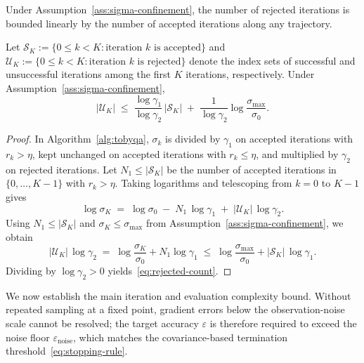 Under Assumption~\ref{ass:sigma-confinement}, the number of rejected iterations is bounded linearly by the number of accepted iterations along any trajectory.

\begin{proposition}
\label{prop:rejected-bound}
Let $\mathcal{S}_K := \{0 \le k < K : \text{iteration } k \text{ is accepted}\}$ and $\mathcal{U}_K := \{0 \le k < K : \text{iteration } k \text{ is rejected}\}$ denote the index sets of successful and unsuccessful iterations among the first $K$ iterations, respectively. Under Assumption~\ref{ass:sigma-confinement},
\begin{equation}\label{eq:rejected-count}
  |\mathcal{U}_K| \;\le\; \frac{\log \gamma_1}{\log \gamma_2}\,|\mathcal{S}_K| \;+\; \frac{1}{\log \gamma_2}\log\frac{\sigma_{\max}}{\sigma_0}.
\end{equation}
\end{proposition}

\begin{proof}
In Algorithm~\ref{alg:tobyqa}, $\sigma_k$ is divided by $\gamma_1$ on accepted iterations with $r_k > \eta$, kept unchanged on accepted iterations with $r_k \le \eta$, and multiplied by $\gamma_2$ on rejected iterations. Let $N_1 \le |\mathcal{S}_K|$ be the number of accepted iterations in $\{0, \dots, K-1\}$ with $r_k > \eta$. Taking logarithms and telescoping from $k = 0$ to $K-1$ gives
\[
  \log \sigma_K \;=\; \log \sigma_0 \;-\; N_1\,\log \gamma_1 \;+\; |\mathcal{U}_K|\,\log \gamma_2.
\]
Using $N_1 \le |\mathcal{S}_K|$ and $\sigma_K \le \sigma_{\max}$ from Assumption~\ref{ass:sigma-confinement}, we obtain
\[
  |\mathcal{U}_K|\,\log \gamma_2
  \;=\; \log\frac{\sigma_K}{\sigma_0} + N_1 \log \gamma_1
  \;\le\; \log\frac{\sigma_{\max}}{\sigma_0} + |\mathcal{S}_K|\,\log \gamma_1.
\]
Dividing by $\log \gamma_2 > 0$ yields~\eqref{eq:rejected-count}.
\end{proof}

We now establish the main iteration and evaluation complexity bound. Without repeated sampling at a fixed point, gradient errors below the observation-noise scale cannot be resolved; the target accuracy $\varepsilon$ is therefore required to exceed the noise floor $\varepsilon_{\mathrm{noise}}$, which matches the covariance-based termination threshold~\eqref{eq:stopping-rule}.


